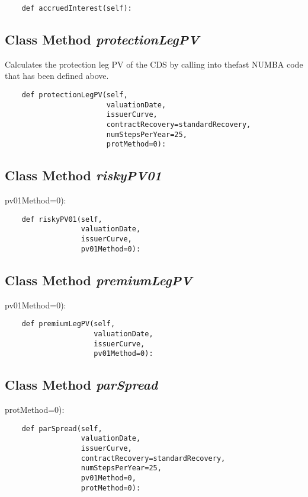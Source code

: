 \documentclass[twoside,11pt]{book}
\begin{document}
\begin{lstlisting}
    def accruedInterest(self):
\end{lstlisting}

\subsection{Class Method {\it protectionLegPV}}
Calculates the protection leg PV of the CDS by calling into thefast NUMBA code that has been defined above. 

\begin{lstlisting}
    def protectionLegPV(self,
                        valuationDate,
                        issuerCurve,
                        contractRecovery=standardRecovery,
                        numStepsPerYear=25,
                        protMethod=0):
\end{lstlisting}

\subsection{Class Method {\it riskyPV01}}
pv01Method=0):

\begin{lstlisting}
    def riskyPV01(self,
                  valuationDate,
                  issuerCurve,
                  pv01Method=0):
\end{lstlisting}

\subsection{Class Method {\it premiumLegPV}}
pv01Method=0):

\begin{lstlisting}
    def premiumLegPV(self,
                     valuationDate,
                     issuerCurve,
                     pv01Method=0):
\end{lstlisting}

\subsection{Class Method {\it parSpread}}
protMethod=0):

\begin{lstlisting}
    def parSpread(self,
                  valuationDate,
                  issuerCurve,
                  contractRecovery=standardRecovery,
                  numStepsPerYear=25,
                  pv01Method=0,
                  protMethod=0):
\end{lstlisting}
\end{document}
